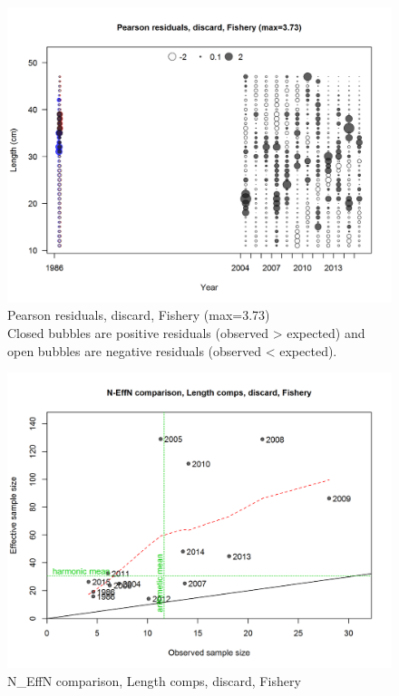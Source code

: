 \documentclass[12pt,]{article}
\begin{document}
\begin{figure}
\centering
\includegraphics{./r4ss/plots_mod1/comp_lenfit_residsflt1mkt1.png}
\caption{Pearson residuals, discard, Fishery (max=3.73)\\
Closed bubbles are positive residuals (observed \textgreater{} expected)
and open bubbles are negative residuals (observed \textless{} expected).
\label{fig:mod1_2_comp_lenfit_residsflt1mkt1}}
\end{figure}

\begin{figure}
\centering
\includegraphics{./r4ss/plots_mod1/comp_lenfit_sampsize_flt1mkt1.png}
\caption{N\_EffN comparison, Length comps, discard, Fishery
\label{fig:mod1_3_comp_lenfit_sampsize_flt1mkt1}}
\end{figure}
\end{document}
